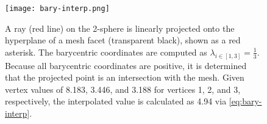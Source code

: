 \begin{figure}
    \centering
    \texttt{[image: bary-interp.png]}
    \caption{A ray (red line) on the 2-sphere is linearly projected onto the hyperplane of a mesh facet (transparent black), shown as a red asterisk. The barycentric coordinates are computed as $\lambda_{i \in [1,3]} = \frac{1}{3}$. Because all barycentric coordinates are positive, it is determined that the projected point is an intersection with the mesh. Given vertex values of \num{8.183}, \num{3.446}, and \num{3.188} for vertices 1, 2, and 3, respectively, the interpolated value is calculated as \num{4.94} via \cref{eq:bary-interp}.}
    \label{fig:bary-interp}
\end{figure}